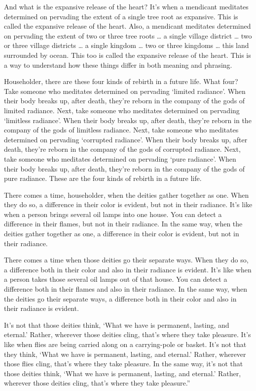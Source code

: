 \documentclass[12pt,openany]{book}%
\begin{document}
And what is the expansive release of the heart? It’s when a mendicant meditates determined on pervading the extent of a single tree root as expansive. This is called the expansive release of the heart. Also, a mendicant meditates determined on pervading the extent of two or three tree roots … a single village district … two or three village districts … a single kingdom … two or three kingdoms … this land surrounded by ocean. This too is called the expansive release of the heart. This is a way to understand how these things differ in both meaning and phrasing. 

Householder, there are these four kinds of rebirth in a future life. What four? Take someone who meditates determined on pervading ‘limited radiance’. When their body breaks up, after death, they’re reborn in the company of the gods of limited radiance. Next, take someone who meditates determined on pervading ‘limitless radiance’. When their body breaks up, after death, they’re reborn in the company of the gods of limitless radiance. Next, take someone who meditates determined on pervading ‘corrupted radiance’. When their body breaks up, after death, they’re reborn in the company of the gods of corrupted radiance. Next, take someone who meditates determined on pervading ‘pure radiance’. When their body breaks up, after death, they’re reborn in the company of the gods of pure radiance. These are the four kinds of rebirth in a future life. 

There comes a time, householder, when the deities gather together as one. When they do so, a difference in their color is evident, but not in their radiance. It’s like when a person brings several oil lamps into one house. You can detect a difference in their flames, but not in their radiance. In the same way, when the deities gather together as one, a difference in their color is evident, but not in their radiance. 

There comes a time when those deities go their separate ways. When they do so, a difference both in their color and also in their radiance is evident. It’s like when a person takes those several oil lamps out of that house. You can detect a difference both in their flames and also in their radiance. In the same way, when the deities go their separate ways, a difference both in their color and also in their radiance is evident. 

It’s not that those deities think, ‘What we have is permanent, lasting, and eternal.’ Rather, wherever those deities cling, that’s where they take pleasure. It’s like when flies are being carried along on a carrying-pole or basket. It’s not that they think, ‘What we have is permanent, lasting, and eternal.’ Rather, wherever those flies cling, that’s where they take pleasure. In the same way, it’s not that those deities think, ‘What we have is permanent, lasting, and eternal.’ Rather, wherever those deities cling, that’s where they take pleasure.” 
\end{document}
